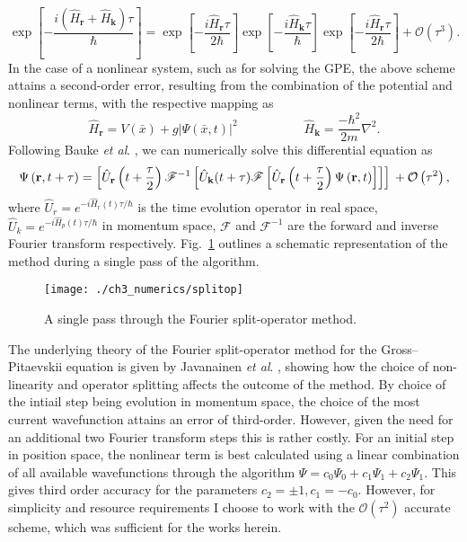 \begin{equation}\label{eqn:3}
\exp\left[ -\frac{ i\left(\hat{H}_{\textbf{r}} + \hat{H}_{\textbf{k}}\right)\tau}{\hbar} \right] = \exp\left[- \frac{i\hat{H}_{\textbf{r}}\tau}{2\hbar} \right]\exp\left[-\frac{i\hat{H}_{\textbf{k}}\tau}{\hbar}\right]\exp\left[ -\frac{i\hat{H}_{\textbf{r}}\tau}{2\hbar}\right] + \mathcal{O}\left(\tau^3\right).
\end{equation}
In the case of a nonlinear system, such as for solving the GPE, the above scheme attains a second-order error, resulting from the combination of the potential and nonlinear terms, with the respective mapping as \cite{BEC:Javanainen_jphysa_2006}
\begin{equation}
\hat{H}_{\textbf{r}} = V(\bar{x}) + g\vert\Psi(\bar{x},t)\vert^2\; \hspace{5em} \hat{H}_{\textbf{k}} = \frac{-\hbar^2}{2m}\nabla^2.
\end{equation}
Following Bauke \textit{et al}. \cite{Num:Bauke_cpc_2011}, we can numerically solve this differential equation as
\begin{equation}
\Psi\left(\textbf{r},t+\tau\right) = \left[\hat{U}_{\mathbf{r}}\left(t+\frac{\tau}{2}\right) \mathscr{F}^{-1} \left[ \hat{U}_{\mathbf{k}}(t+\tau) \mathscr{F} \left[ \hat{U}_{\mathbf{r}}\left(t+\frac{\tau}{2}\right) \Psi\left(\mathbf{r},t\right) \right] \right] \right]  \\ + \mathcal{O}\left(\tau^2\right),
\end{equation}
where $\hat{U}_{r}=e^{-i\hat{H}_{r}(t)\tau/\hbar}$ is the time evolution operator in real space, $\hat{U}_{k}=e^{-i\hat{H}_{p}(t)\tau/\hbar}$ in momentum space,  $\mathscr{F}$ and $\mathscr{F}^{-1}$ are the forward and inverse Fourier transform respectively. Fig.~\ref{fig:num_splitop} outlines a schematic representation of the method during a single pass of the algorithm.

\begin{figure}
    \centering
    \texttt{[image: ./ch3\_numerics/splitop]}
    \caption{A single pass through the Fourier split-operator method.}
    \label{fig:num_splitop}
\end{figure}

The underlying theory of the Fourier split-operator method for the Gross--Pitaevskii equation is given by Javanainen \textit{et al}. \cite{BEC:Javanainen_jphysa_2006}, showing how the choice of non-linearity and operator splitting affects the outcome of the method. By choice of the intiail step being evolution in momentum space, the choice of the most current wavefunction attains an error of third-order. However, given the need for an additional two Fourier transform steps this is rather costly. For an initial step in position space, the nonlinear term is best calculated using a linear combination of all available wavefunctions through the algorithm $\Psi = c_0\Psi_0 + c_1\Psi_1 + c_2\Psi_1$. This gives third order accuracy for the parameters $c_2=\pm 1, c_1=-c_0$. However, for simplicity and resource requirements I choose to work with the $\mathcal{O}\left(\tau^2\right)$ accurate scheme, which was sufficient for the works herein.

